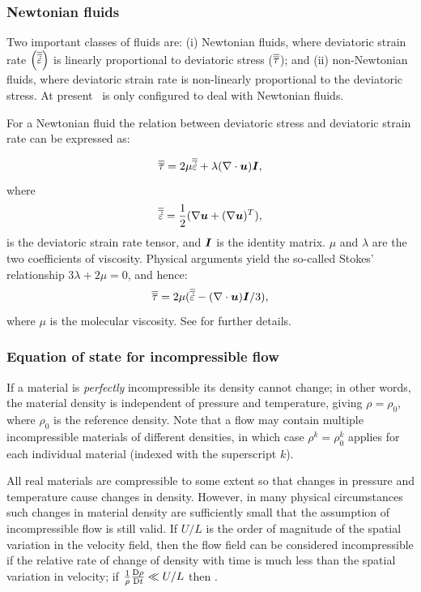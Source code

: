 \subsubsection{Newtonian fluids}

Two important classes of fluids are: (i) Newtonian fluids, where deviatoric strain rate $\left(\overline{\overline{\dot{\varepsilon}}}\right)$ is linearly proportional to deviatoric stress ($\overline{\overline{\tau}}$); and (ii) non-Newtonian fluids, where deviatoric strain rate is non-linearly proportional to the deviatoric stress. At present \fluidity\ is only configured to deal with Newtonian fluids.

For a Newtonian fluid the relation between deviatoric stress and deviatoric strain rate can be expressed as: 

\begin{equation}
\overline{\overline{\tau}} = 2\mu \overline{\overline{\dot{\varepsilon}}} + \lambda(\nabla\cdot{\mbox{\boldmath$u$}}){\mbox{\boldmath$I$}},
\end{equation}
where 
\begin{equation}
 \overline{\overline{\dot{\varepsilon}}} = \frac{1}{2}(\nabla{\mbox{\boldmath$u$}} + (\nabla{\mbox{\boldmath$u$}})^T),
\end{equation}
is the
deviatoric strain rate tensor, and ${\mbox{\boldmath$I$}}$ is the identity matrix. $\mu$ and
$\lambda$ are the two coefficients of viscosity. Physical arguments
yield the so-called Stokes' relationship $3\lambda+2\mu=0$, and
hence:
\begin{equation}
\overline{\overline{\tau}} = 2\mu(\overline{\overline{\dot{\varepsilon}}} - (\nabla\cdot{\mbox{\boldmath$u$}}){\mbox{\boldmath$I$}}/3),
\end{equation}
where $\mu$ is the molecular viscosity. See \cite{batchelor1967} for further
details.

\subsubsection{Equation of state for incompressible flow}
\label{sec:IncompressibleFlow}

If a material is \emph{perfectly} incompressible its density cannot change;
in other words, the material density is independent of pressure and
temperature, giving $\rho = \rho_0$, where $\rho_0$ is the reference
density. Note that a flow may contain multiple incompressible materials of
different densities, in which case $\rho^k=\rho_0^k$ applies for each
individual material (indexed with the superscript $k$).

All real materials are compressible to some extent so that changes in
pressure and temperature cause changes in density.  However, in many
physical circumstances such changes in material density are sufficiently
small that the assumption of incompressible flow is still valid. If $U/L$ is
the order of magnitude of the spatial variation in the velocity field, then
the flow field can be considered incompressible if the relative rate of
change of density with time is much less than the spatial variation in
velocity; \ie if $\frac{1}{\rho}\frac{\mathrm{D}\rho}{\mathrm{D} t}\ll U/L$ then \cite[][p.167]{batchelor1967}.

